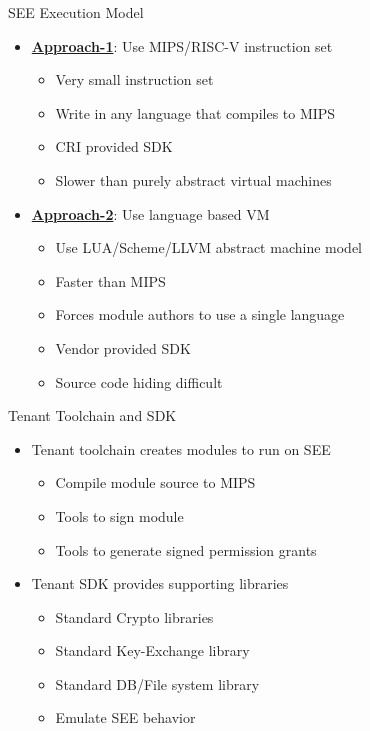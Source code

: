 \documentclass[handout,xcolor=svgnames]{beamer}
\newcommand{\hicolor}{darkorange}
\newcommand{\imp}[1]{\begin{center}\Large{\color{\hicolor}{#1}}\end{center}}
\newcommand{\pointout}[1]{{\underline{\textbf{#1}}}}
\begin{document}
\begin{frame}
  {SEE Execution Model}
  \imp{Abstract Machine Emulation better suited for SEE}

  \begin{itemize}
      \item \pointout{Approach-1}: Use MIPS/RISC-V instruction set
      \begin{itemize}
          \item Very small instruction set
          \item Write in any language that compiles to MIPS
          \item CRI provided SDK
          \item Slower than purely abstract virtual machines
      \end{itemize}
      \item \pointout{Approach-2}: Use language based VM
      \begin{itemize}
          \item Use LUA/Scheme/LLVM abstract machine model
          \item Faster than MIPS
          \item Forces module authors to use a single language
          \item Vendor provided SDK
          \item Source code hiding difficult
      \end{itemize}
      \end{itemize}
\end{frame}


\begin{frame}
  {Tenant Toolchain and SDK}

  \begin{itemize}
      \item Tenant toolchain creates modules to run on SEE
      \begin{itemize}
          \item Compile module source to MIPS
          \item Tools to sign module
          \item Tools to generate signed permission grants
      \end{itemize}
      \item Tenant SDK provides supporting libraries
      \begin{itemize}
          \item Standard Crypto libraries
          \item Standard Key-Exchange library
          \item Standard DB/File system library
          \item Emulate SEE behavior
      \end{itemize}
      \end{itemize}
\end{frame}
\end{document}
